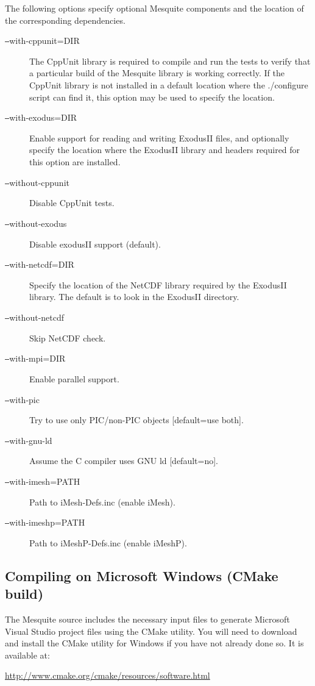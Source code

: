 The following options specify optional Mesquite components and the location 
of the corresponding dependencies.
\begin{description}
\item[\texttt{--}with-cppunit=DIR]  The CppUnit library is required to compile
and run the tests to verify that a particular build of the Mesquite library
is working correctly.  If the CppUnit library is not installed in a default location where the ./configure script can find it, this option may be used to specify
the location.
\item[\texttt{--}with-exodus=DIR]  Enable support for reading and writing
ExodusII files, and optionally specify the location where the ExodusII library
and headers required for this option are installed.
\item[\texttt{--}without-cppunit]  Disable CppUnit tests.
\item[\texttt{--}without-exodus]  Disable exodusII support (default).
\item[\texttt{--}with-netcdf=DIR]  Specify the location of the NetCDF library
required by the ExodusII library.  The default is to look in the ExodusII
directory.
\item[\texttt{--}without-netcdf]  Skip NetCDF check.
\item[\texttt{--}with-mpi=DIR]  Enable parallel support.
\item[\texttt{--}with-pic]  Try to use only PIC/non-PIC objects [default=use both].
\item[\texttt{--}with-gnu-ld]  Assume the C compiler uses GNU ld [default=no]. 
\item[\texttt{--}with-imesh=PATH]  Path to iMesh-Defs.inc (enable iMesh).
\item[\texttt{--}with-imeshp=PATH]  Path to iMeshP-Defs.inc (enable iMeshP).
\end{description}

\subsection{Compiling on Microsoft Windows (CMake build) \label{windows_build} }

The Mesquite source includes the necessary input files to generate Microsoft
Visual Studio project files using the CMake utility.  You will need to 
download and install the CMake utility for Windows if you have not already done so.  It is available at:
\begin{center}
 \url{http://www.cmake.org/cmake/resources/software.html}
\end{center}

